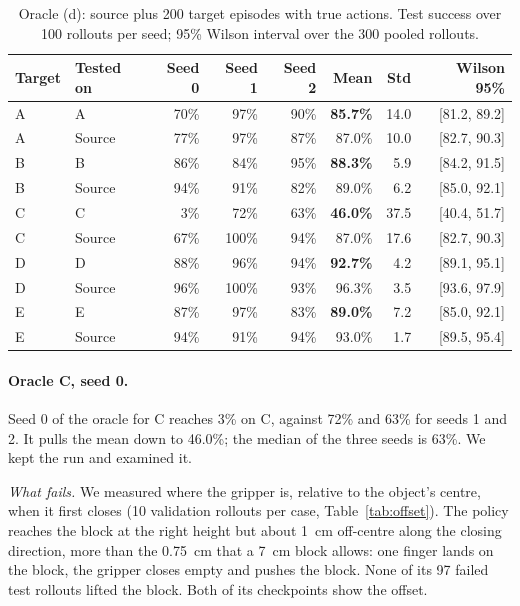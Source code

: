 \documentclass{article}
\begin{document}
\begin{table}[t]
  \caption{Oracle (d): source plus 200 target episodes with true actions. Test success
  over 100 rollouts per seed; 95\% Wilson interval over the 300 pooled rollouts.}
  \label{tab:oracle}
  \centering
  \small
  \begin{tabular}{@{}llrrrrrr@{}}
    \toprule
    Target & Tested on & Seed 0 & Seed 1 & Seed 2 & Mean & Std & Wilson 95\% \\
    \midrule
    A & A & 70\% & 97\% & 90\% & \textbf{85.7\%} & 14.0 & [81.2, 89.2] \\
    A & Source & 77\% & 97\% & 87\% & 87.0\% & 10.0 & [82.7, 90.3] \\
    B & B & 86\% & 84\% & 95\% & \textbf{88.3\%} & 5.9 & [84.2, 91.5] \\
    B & Source & 94\% & 91\% & 82\% & 89.0\% & 6.2 & [85.0, 92.1] \\
    C & C & 3\% & 72\% & 63\% & \textbf{46.0\%} & 37.5 & [40.4, 51.7] \\
    C & Source & 67\% & 100\% & 94\% & 87.0\% & 17.6 & [82.7, 90.3] \\
    D & D & 88\% & 96\% & 94\% & \textbf{92.7\%} & 4.2 & [89.1, 95.1] \\
    D & Source & 96\% & 100\% & 93\% & 96.3\% & 3.5 & [93.6, 97.9] \\
    E & E & 87\% & 97\% & 83\% & \textbf{89.0\%} & 7.2 & [85.0, 92.1] \\
    E & Source & 94\% & 91\% & 94\% & 93.0\% & 1.7 & [89.5, 95.4] \\
    \bottomrule
  \end{tabular}
\end{table}

\paragraph{Oracle C, seed 0.}
Seed 0 of the oracle for C reaches 3\% on C, against 72\% and 63\% for seeds 1 and 2. It
pulls the mean down to 46.0\%; the median of the three seeds is 63\%. We kept the run and
examined it.

\emph{What fails.} We measured where the gripper is, relative to the object's centre, when
it first closes (10 validation rollouts per case, Table~\ref{tab:offset}). The policy
reaches the block at the right height but about 1~cm off-centre along the closing
direction, more than the 0.75~cm that a 7~cm block allows: one finger lands on the block,
the gripper closes empty and pushes the block. None of its 97 failed test rollouts lifted
the block. Both of its checkpoints show the offset.
\end{document}

